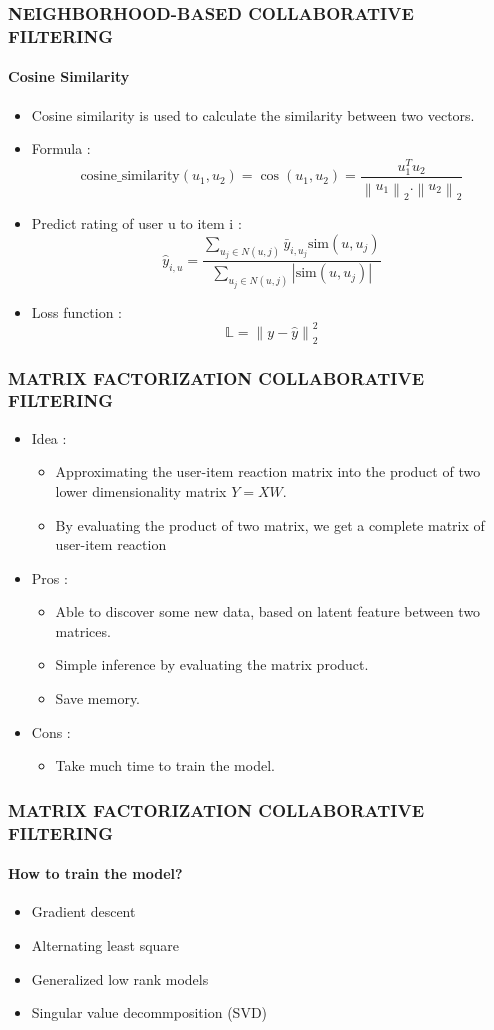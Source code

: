 \documentclass[11pt]{beamer}
\begin{document}
\begin{frame}
\frametitle{\textbf{NEIGHBORHOOD-BASED COLLABORATIVE FILTERING}}
\framesubtitle{Cosine Similarity}
\begin{itemize}
	\pause\item Cosine similarity is used to calculate the similarity between two vectors.
	\pause\item Formula : 
$$ \mbox{cosine\_similarity}(u_1, u_2) = \cos(u_1,u_2) = \dfrac{u_1^Tu_2}{\left\|u_1\right\|_2.\left\|u_2\right\|_2}  $$
	\pause\item Predict rating of user u to item i : \\
	$$ \hat{y}_{i,u} = \dfrac{\sum_{u_j\in N(u,j)} \bar{y}_{i,u_j}\mbox{sim}(u, u_j)}{\sum_{u_j\in N(u,j)}|\mbox{sim}(u, u_j)|} $$
	\pause\item Loss function :
	$$\mathbb{L} = \left\| y - \hat{y} \right\|^2_2 $$

\end{itemize} 

\end{frame}
\begin{frame}
\frametitle{\textbf{MATRIX FACTORIZATION COLLABORATIVE FILTERING}}
\begin{itemize}
	\pause\item Idea : 
	\begin{itemize}
		\item Approximating the user-item reaction matrix into the product of two lower dimensionality matrix $Y = XW$.
		\item By evaluating the product of two matrix, we get a complete matrix of user-item reaction 
	\end{itemize}
	\pause\item Pros :
	\begin{itemize}
		\item Able to discover some new data, based on latent feature between two matrices.
		\item Simple inference by evaluating the matrix product.
		\item Save memory.
	\end{itemize}
	\pause\item Cons : 
	\begin{itemize}
		\item Take much time to train the model.
	\end{itemize}
\end{itemize}
\end{frame}
\begin{frame}
\frametitle{\textbf{MATRIX FACTORIZATION COLLABORATIVE FILTERING}}
\framesubtitle{\textbf{How to train the model?}}
\begin{itemize}
	\pause\item Gradient descent
	\pause\item Alternating least square
	\pause\item Generalized low rank models
	\pause\item Singular value decommposition (SVD)
\end{itemize}	
\end{frame}
\end{document}
